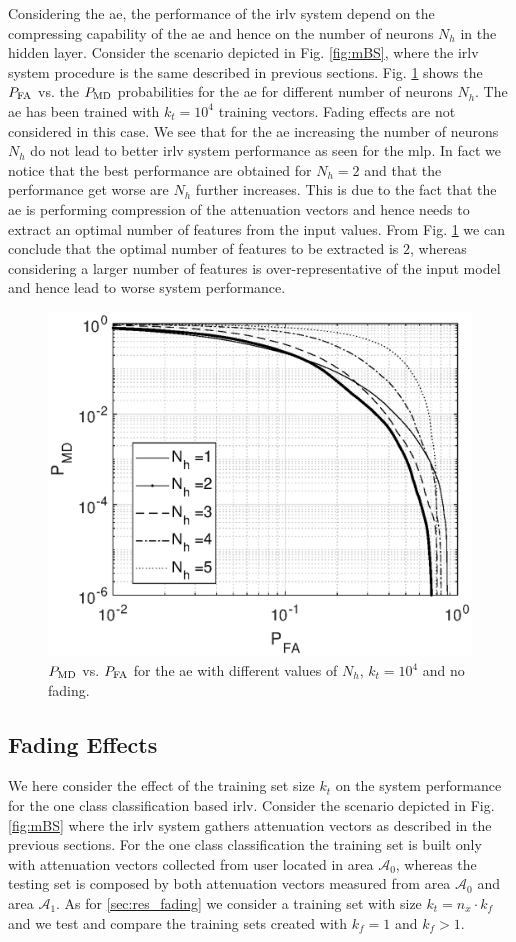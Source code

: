 \documentclass[draftcls,onecolumn,12pt]{IEEEtran}
\begin{document}
Considering the \ac{ae}, the performance of the \ac{irlv} system depend on the compressing capability of the \ac{ae} and hence on the number of neurons $N_h$ in the hidden layer. Consider the scenario depicted in Fig. \ref{fig:mBS}, where the \ac{irlv} system procedure is the same described in previous sections. Fig. \ref{fig:aeNh} shows the $P_{\rm FA}$ vs. the $P_{\rm MD}$ probabilities for the \ac{ae} for different number of neurons $N_h$. The \ac{ae} has been trained with $k_t=10^4$ training vectors. Fading effects are not considered in this case. We see that for the \ac{ae} increasing the number of neurons $N_h$ do not lead to better \ac{irlv} system performance as seen for the \ac{mlp}. In fact we notice that the best performance are obtained for $N_h=2$ and that the performance get worse are $N_h$ further increases. This is due to the fact that the \ac{ae} is performing compression of the attenuation vectors and hence needs to extract an optimal number of features from the input values. From Fig. \ref{fig:aeNh} we can conclude that the optimal number of features to be extracted is $2$, whereas considering a larger number of features is over-representative of the input model and hence lead to worse system performance.

\begin{figure}[t]
    \centering
    \includegraphics[width=0.5\columnwidth]{res_ae_onNeur.eps}
    \caption{$P_{\rm MD}$ vs. $P_{\rm FA}$ for the \ac{ae} with different values of $N_h$, $k_t=10^4$ and no fading.}
    \label{fig:aeNh}
\end{figure}

\subsection{Fading Effects}
We here consider the effect of the training set size $k_t$ on the system performance for the one class classification based \ac{irlv}. Consider the scenario depicted in Fig. \ref{fig:mBS} where the \ac{irlv} system gathers attenuation vectors as described in the previous sections. For the one class classification the training set is built only with attenuation vectors collected from user located in area $\mathcal{A}_0$, whereas the testing set is composed by both attenuation vectors measured from area $\mathcal{A}_0$ and area $\mathcal{A}_1$. As for \ref{sec:res_fading} we consider a training set with size $k_t = n_x \cdot k_f$ and we test and compare the training sets created with $k_f=1$ and $k_f >1$.
\end{document}

